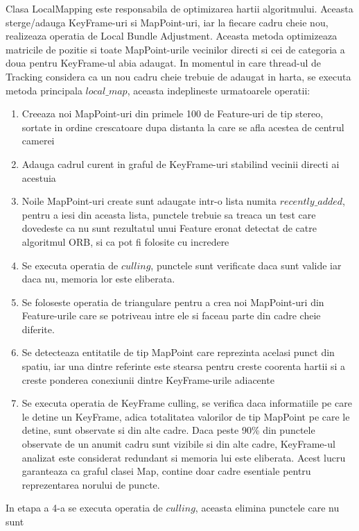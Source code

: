 \documentclass[12pt,a4paper]{report}
\begin{document}
Clasa LocalMapping este responsabila de optimizarea hartii algoritmului. Aceasta sterge/adauga KeyFrame-uri
si MapPoint-uri, iar la fiecare cadru cheie nou, realizeaza operatia de Local Bundle 
Adjustment. Aceasta metoda optimizeaza matricile de pozitie si toate MapPoint-urile vecinilor 
directi si cei de categoria a doua pentru KeyFrame-ul abia adaugat. In momentul in care 
thread-ul de Tracking considera ca un nou cadru cheie trebuie de adaugat in harta, se executa
metoda principala $ local\_map $, aceasta indeplineste urmatoarele operatii:
\begin{enumerate}
    \item Creeaza noi MapPoint-uri din primele 100 de Feature-uri de tip stereo, 
sortate in ordine crescatoare dupa distanta la care se afla acestea de centrul camerei  
    \item Adauga cadrul curent in graful de KeyFrame-uri stabilind vecinii directi ai
acestuia 
    \item Noile MapPoint-uri create sunt adaugate intr-o lista numita $ recently\_added $,
pentru a iesi din aceasta lista, punctele trebuie sa treaca un test care dovedeste ca 
nu sunt rezultatul unui Feature eronat detectat de catre algoritmul ORB, si ca pot fi 
folosite cu incredere
    \item Se executa operatia de $ culling $, punctele sunt verificate daca sunt valide iar
daca nu, memoria lor este eliberata.
    \item Se foloseste operatia de triangulare pentru a crea noi MapPoint-uri din 
Feature-urile care se potriveau intre ele si faceau parte din cadre cheie diferite.
    \item Se detecteaza entitatile de tip MapPoint care reprezinta acelasi punct
din spatiu, iar una dintre referinte este stearsa pentru creste coorenta hartii si 
a creste ponderea conexiunii dintre KeyFrame-urile adiacente    
    \item Se executa operatia de KeyFrame culling, se verifica daca informatiile pe 
care le detine un KeyFrame, adica totalitatea valorilor de tip MapPoint pe care le 
detine, sunt observate si din alte cadre. Daca peste 90\% din punctele observate de un 
anumit cadru sunt vizibile si din alte cadre, KeyFrame-ul analizat este considerat redundant
si memoria lui este eliberata. Acest lucru garanteaza ca graful clasei Map, contine 
doar cadre esentiale pentru reprezentarea norului de puncte. 
\end{enumerate}
In etapa a 4-a se executa operatia de $ culling $, aceasta elimina punctele care nu sunt
\end{document}
